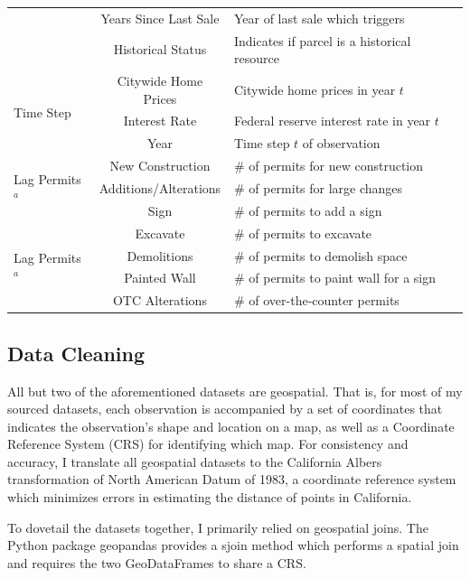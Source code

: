 \documentclass[a4paper,12pt]{article}
\begin{document}
\begin{longtable}{|p{1.6cm}|c|p{7cm}|}
& Years Since Last Sale & Year of last sale which triggers \\ 
& Historical Status & Indicates if parcel is a historical resource\\
\hline
\multirow{3}{2cm}{Time Step}
& Citywide Home Prices & Citywide home prices in year $t$ \\
& Interest Rate & Federal reserve interest rate in year $t$ \\ 
& Year & Time step $t$ of observation \\
\hline
\multirow{3}{2cm}{Lag Permits$^a$} & New Construction & \# of permits for new construction \\
& Additions/Alterations & \# of permits for large changes\\
& Sign & \# of permits to add a sign \\
\multirow{4}{2cm}{Lag Permits$^a$} & Excavate & \# of permits to excavate \\
& Demolitions & \# of permits to demolish space \\
& Painted Wall & \# of permits to paint wall for a sign \\
& OTC Alterations & \# of over-the-counter permits
\label{tab:data.sources}
\end{longtable}

\subsection{Data Cleaning}

All but two of the aforementioned datasets are geospatial. That is, for most of my sourced datasets, each observation is accompanied by a set of coordinates that indicates the observation’s shape and location on a map, as well as a Coordinate Reference System (CRS) for identifying which map. For consistency and accuracy, I translate all geospatial datasets to the California Albers transformation of North American Datum of 1983, a coordinate reference system which minimizes errors in estimating the distance of points in California.

To dovetail the datasets together, I primarily relied on geospatial joins. The Python package geopandas provides a sjoin method which performs a spatial join and requires the two GeoDataFrames to share a CRS.  
\end{document}
